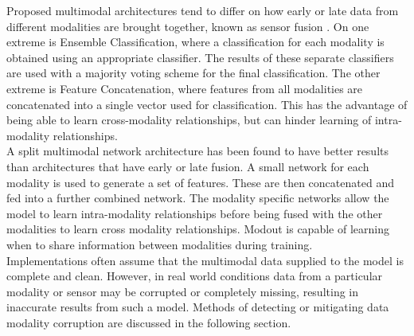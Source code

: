 Proposed multimodal architectures tend to differ on how early or late data from different modalities are brought together, known as sensor fusion \cite{RaduMultimodal}. On one extreme is Ensemble Classification, where a classification for each modality is obtained using an appropriate classifier. The results of these separate classifiers are used with a majority voting scheme for the final classification. The other extreme is Feature Concatenation, where features from all modalities are concatenated into a single vector used for classification. This has the advantage of being able to learn cross-modality relationships, but can hinder learning of intra-modality relationships.\\

A split multimodal network architecture \cite{RaduMultimodal} has been found to have better results than architectures that have early or late fusion. A small network for each modality is used to generate a set of features. These are then concatenated and fed into a further combined network. The modality specific networks allow the model to learn intra-modality relationships before being fused with the other modalities to learn cross modality relationships. Modout \cite{modout} is capable of learning when to share information between modalities during training.\\

Implementations often assume that the multimodal data supplied to the model is complete and clean. However, in real world conditions data from a particular modality or sensor may be corrupted or completely missing, resulting in inaccurate results from such a model. Methods of detecting or mitigating data modality corruption are discussed in the following section.\\
